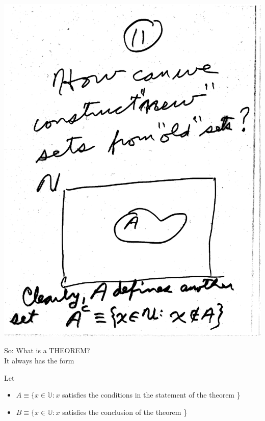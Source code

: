 \documentclass[10pt,a4paper]{article}
\begin{document}
{{\includegraphics[scale=.5]{Pages/ST_11}

\newpage

\noindent So: What is a THEOREM?
\vspace{2mm}
\\ \noindent It always has the form 

\begin{center}
\end{center}

\vspace{2mm}
\noindent Let
\begin{itemize}
\item $A \equiv \{ x \in \mathbb{U}: x $ satisfies the conditions in the statement of the theorem \}
\item $B \equiv \{ x \in \mathbb{U}: x $ satisfies the conclusion of the theorem \}
\end{itemize}

}}
\end{document}
